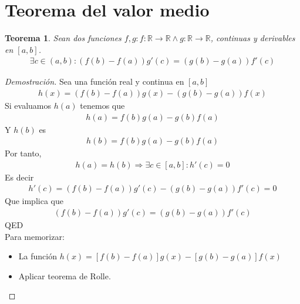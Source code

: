 \documentclass{article}
\newtheorem{midval}{Teorema}
\begin{document}
\section{Teorema del valor medio}
\begin{midval}
    Sean dos funciones $f,g : f: \mathbb{R} \to \mathbb{R} \wedge g: \mathbb{R} \to \mathbb{R}$, continuas y derivables en $[a,b]$.
    \begin{equation}
        \begin{split}
            \exists c \in (a,b): (f(b)-f(a))g'(c) = (g(b) - g(a))f'(c)
        \end{split}
    \end{equation}
\end{midval}
\begin{proof}[Demostración]
    Sea una función real y continua en $[a,b]$
    \begin{equation}
        \begin{split}
            h(x)= (f(b)-f(a))g(x)- (g(b)-g(a))f(x)
        \end{split}
    \end{equation}
    Si evaluamos $h(a)$ tenemos que
    \begin{equation}
        \begin{split}
            h(a)= f(b)g(a)-g(b)f(a)
        \end{split}
    \end{equation}
    Y $h(b)$ es
    \begin{equation}
        \begin{split}
            h(b)=f(b)g(a)-g(b)f(a)
        \end{split}
    \end{equation}
    Por tanto,
    \begin{equation}
        \begin{split}
            h(a)=h(b)\Rightarrow \exists c \in [a,b] : h'(c)=0
        \end{split}
    \end{equation}
    Es decir
    \begin{equation}
        \begin{split}
            h'(c)=(f(b)-f(a))g'(c)- (g(b)-g(a))f'(c)=0
        \end{split}
    \end{equation}
    Que implica que
    \begin{equation}
        \begin{split}
            (f(b)-f(a))g'(c)=(g(b)-g(a))f'(c)
        \end{split}
    \end{equation}
    QED\\
    Para memorizar:
    \begin{itemize}
	    \item La función $h(x) = [f(b)-f(a)]g(x) - [g(b)-g(a)]f(x)$
		\item Aplicar teorema de Rolle.
	\end{itemize}
\end{proof}
\end{document}

